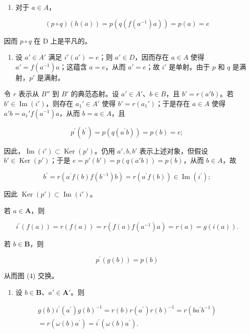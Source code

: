\begin{enumerate}
\def\labelenumi{(\roman{enumi})}
\setcounter{enumi}{1}
\tightlist
\item
  对于 \(a \in A\)，
\end{enumerate}

\[
(p \circ q) (h (a)) = p (q (f (a ^ {- 1}) a)) = p (a) = e
\]

因而 \(p \circ q\) 在 D 上是平凡的。

\begin{enumerate}
\def\labelenumi{(\roman{enumi})}
\setcounter{enumi}{2}
\tightlist
\item
  设 \(a' \in A'\) 满足 \(i'(a') = e\)；则 \(a' \in D\)，因而存在 \(a \in A\) 使得 \(a' = f(a^{-1})a\)；这蕴含 \(a = e\)，从而 \(a' = e\)；故 \(i'\) 是单射。由于 \(p\) 和 \(q\) 是满射，\(p'\) 是满射。
\end{enumerate}

令 \(r\) 表示从 \(B''\) 到 \(B'\) 的典范态射。设 \(a' \in A'\)、\(b \in B\)，且 \(b' = r(a'b)\)。若 \(b' \in \operatorname{Im}(i')\)，则存在 \(a_1' \in A'\) 使得 \(b' = r(a_1')\)；于是存在 \(a \in A\) 使得 \(a'b = a_1'f(a^{-1})a\)，从而 \(b = a \in A\)，且

\[
p ^ {\prime} (b ^ {\prime}) = p (q (a ^ {\prime} b)) = p (b) = e;
\]

因此，\(\operatorname{Im}(i') \subset \operatorname{Ker}(p')\)。仍用 \(a', b, b'\) 表示上述对象，但假设 \(b' \in \operatorname{Ker}(p')\)；于是 \(e = p'(b') = p(q(a'b)) = p(b)\)，从而 \(b \in A\)，故

\[
b ^ {\prime} = r (a ^ {\prime} f (b) f (b ^ {- 1}) b) = r (a ^ {\prime} f (b)) \in \operatorname{Im} (i ^ {\prime});
\]

因此 \(\operatorname{Ker}(p') \subset \operatorname{Im}(i')\)。

若 \(a\in \mathbf{A}\)，则

\[
i ^ {\prime} (f (a)) = r (f (a)) = r (f (a) f \left(a ^ {- 1}\right) a) = r (a) = g (i (a)).
\]

若 \(b\in \mathbf{B}\)，则

\[
p ^ {\prime} (g (b)) = p (b)
\]

从而图 (4) 交换。

\begin{enumerate}
\def\labelenumi{(\roman{enumi})}
\setcounter{enumi}{3}
\tightlist
\item
  设 \(b \in \mathbf{B}\)、\(a' \in \mathbf{A}'\)。则
\end{enumerate}

\[
\begin{array}{r} g (b) i ^ {\prime} (a ^ {\prime}) g (b) ^ {- 1} = r (b) r (a ^ {\prime}) r (b) ^ {- 1} = r (b a ^ {\prime} b ^ {- 1}) \\ = r (\omega (b) a ^ {\prime}) = i ^ {\prime} (\omega (b) a ^ {\prime}). \end{array}
\]

